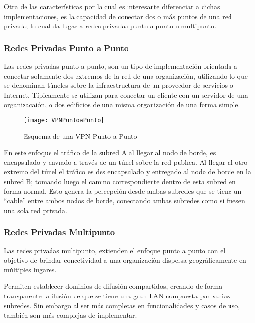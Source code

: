 Otra de las características por la cual es interesante diferenciar a dichas implementaciones, es la capacidad de conectar dos o m\'as puntos de una red privada; lo cual da lugar a redes privadas punto a punto o multipunto.

\subsubsection{Redes Privadas Punto a Punto}

Las redes privadas punto a punto, son un tipo de implementaci\'on orientada a conectar solamente dos extremos de la red de una organizaci\'on, utilizando lo que se denominan t\'uneles sobre la infraestructura de un proveedor de servicios o Internet. T\'ipicamente se utilizan para conectar un cliente con un servidor de una organizacai\'on, o dos edificios de una misma organizaci\'on de una forma simple. 

\begin{figure}[htbp!] 
\centering    
\texttt{[image: VPNPuntoaPunto]}
\caption[Esquema de una VPN Punto a Punto]{Esquema de una VPN Punto a Punto}
\label{fig:VPNPuntoAPunto}
\end{figure}

En este enfoque el tr\'afico de la subred A al llegar al nodo de borde, es encapsulado y enviado a trav\'es de un túnel sobre la red publica. Al llegar al otro extremo del túnel el tr\'afico es des encapsulado y entregado al nodo de borde en la subred B; tomando luego el camino correspondiente dentro de esta subred en forma normal. Esto genera la percepci\'on desde ambas subredes que se tiene un “cable” entre ambos nodos de borde, conectando ambas subredes como si fuesen una sola red privada.
 
\subsubsection{Redes Privadas Multipunto}

Las redes privadas multipunto, extienden el enfoque punto a punto con el objetivo de brindar conectividad a una organizaci\'on dispersa geogr\'aficamente en m\'ultiples lugares.

Permiten establecer dominios de difusi\'on compartidos, creando de forma transparente la ilusi\'on de que se tiene una gran LAN compuesta por varias subredes. Sin embargo al ser m\'as completas en funcionalidades y casos de uso, tambi\'en son m\'as complejas de implementar.\\ 

